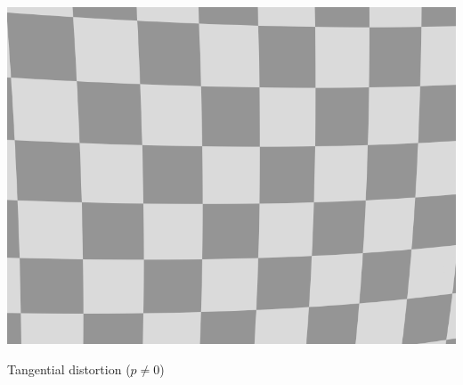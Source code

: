 \documentclass[utf8,stillsansserifmath,fleqn,t]{beamer}
\begin{document}
\begin{frame}[label=distortion]
\begin{minipage}{.49\textwidth}
\centerline{\includegraphics[width=.6\textwidth]{./fig/distortion-tangential.png}}
\centerline{Tangential distortion ($p\neq0$)}
\end{minipage}
\end{frame}
\end{document}

